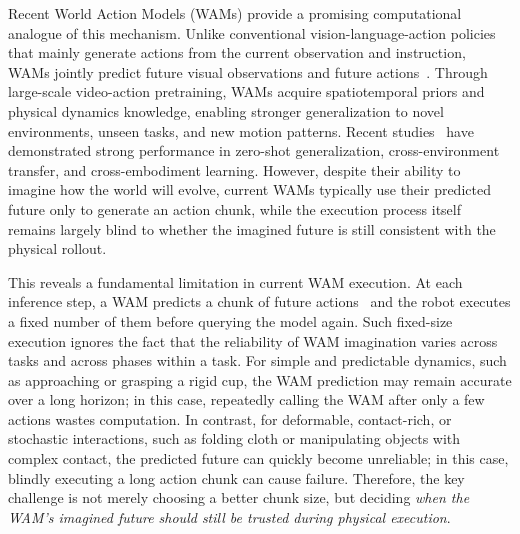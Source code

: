 \documentclass{article}
\begin{document}
Recent World Action Models (WAMs) provide a promising computational analogue of this mechanism. Unlike conventional vision-language-action policies~\cite{shukor2025smolvla, black2024pi_0, black2025pi_, lv2025f1} that mainly generate actions from the current observation and instruction, WAMs jointly predict future visual observations and future actions~\citep{pai2025mimic, liang2025video, li2026causal, du2023learning, ye2024latent, guo2024prediction}. Through large-scale video-action pretraining, WAMs acquire spatiotemporal priors and physical dynamics knowledge, enabling stronger generalization to novel environments, unseen tasks, and new motion patterns. Recent studies~\citep{bi2025motus, li2025unified, zhu2025unified, ye2026gigaworld, ye2026world, yuan2026fast, beingh07} have demonstrated strong performance in zero-shot generalization, cross-environment transfer, and cross-embodiment learning. However, despite their ability to imagine how the world will evolve, current WAMs typically use their predicted future only to generate an action chunk, while the execution process itself remains largely blind to whether the imagined future is still consistent with the physical rollout.


This reveals a fundamental limitation in current WAM execution. At each inference step, a WAM predicts a chunk of future actions~\citep{zhao2023learning} and the robot executes a fixed number of them before querying the model again. Such fixed-size execution ignores the fact that the reliability of WAM imagination varies across tasks and across phases within a task. For simple and predictable dynamics, such as approaching or grasping a rigid cup, the WAM prediction may remain accurate over a long horizon; in this case, repeatedly calling the WAM after only a few actions wastes computation. In contrast, for deformable, contact-rich, or stochastic interactions, such as folding cloth or manipulating objects with complex contact, the predicted future can quickly become unreliable; in this case, blindly executing a long action chunk can cause failure. Therefore, the key challenge is not merely choosing a better chunk size, but deciding \emph{when the WAM's imagined future should still be trusted during physical execution}.
\end{document}
